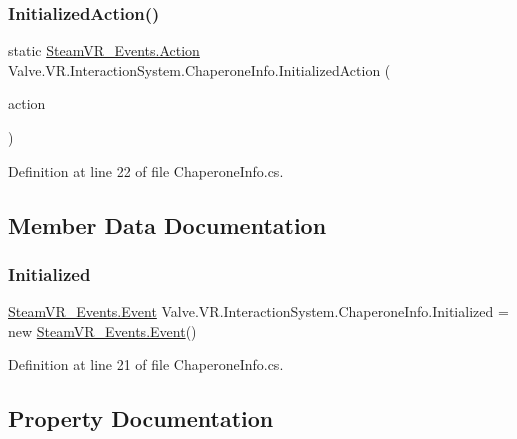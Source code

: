 \subsubsection{\texorpdfstring{InitializedAction()}{InitializedAction()}}
{\footnotesize\ttfamily static \mbox{\hyperlink{class_valve_1_1_v_r_1_1_steam_v_r___events_1_1_action}{Steam\+V\+R\+\_\+\+Events.\+Action}} Valve.\+V\+R.\+Interaction\+System.\+Chaperone\+Info.\+Initialized\+Action (\begin{DoxyParamCaption}\item[{Unity\+Action}]{action }\end{DoxyParamCaption})\hspace{0.3cm}{\ttfamily [static]}}



Definition at line 22 of file Chaperone\+Info.\+cs.



\subsection{Member Data Documentation}
\mbox{\label{class_valve_1_1_v_r_1_1_interaction_system_1_1_chaperone_info_a91c71f8bac1161a17b2ab6f9c68333b0}} 
\subsubsection{\texorpdfstring{Initialized}{Initialized}}
{\footnotesize\ttfamily \mbox{\hyperlink{class_valve_1_1_v_r_1_1_steam_v_r___events_1_1_event}{Steam\+V\+R\+\_\+\+Events.\+Event}} Valve.\+V\+R.\+Interaction\+System.\+Chaperone\+Info.\+Initialized = new \mbox{\hyperlink{class_valve_1_1_v_r_1_1_steam_v_r___events_1_1_event}{Steam\+V\+R\+\_\+\+Events.\+Event}}()\hspace{0.3cm}{\ttfamily [static]}}



Definition at line 21 of file Chaperone\+Info.\+cs.



\subsection{Property Documentation}
\mbox{\label{class_valve_1_1_v_r_1_1_interaction_system_1_1_chaperone_info_a284c130f90d6b034c43357a856ded3c3}} 
